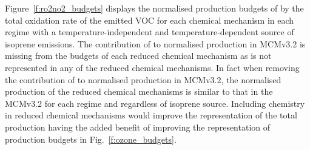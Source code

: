 Figure~\ref{f:ro2no2_budgets} displays the normalised production budgets of  by the total oxidation rate of the emitted VOC for each chemical mechanism in each  regime with a temperature-independent and temperature-dependent source of isoprene emissions.
The contribution of  to normalised  production in MCMv3.2 is missing from the budgets of each reduced chemical mechanism as  is not represented in any of the reduced chemical mechanisms.
In fact when removing the contribution of  to normalised  production in MCMv3.2, the normalised  production of the reduced chemical mechanisms is similar to that in the MCMv3.2 for each  regime and regardless of isoprene source.
Including  chemistry in reduced chemical mechanisms would improve the representation of the total  production having the added benefit of improving the representation of  production budgets in Fig.~\ref{f:ozone_budgets}.

